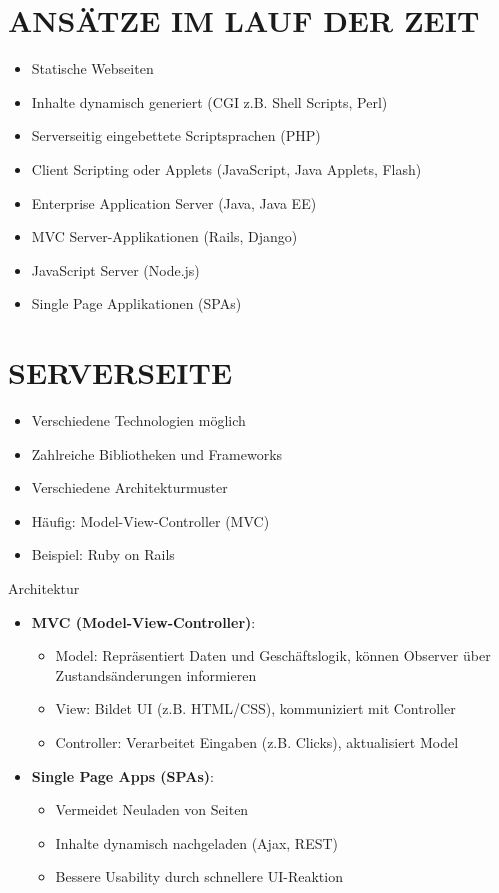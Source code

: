 \section*{ANSÄTZE IM LAUF DER ZEIT}
\begin{itemize}
  \item Statische Webseiten
  \item Inhalte dynamisch generiert (CGI z.B. Shell Scripts, Perl)
  \item Serverseitig eingebettete Scriptsprachen (PHP)
  \item Client Scripting oder Applets (JavaScript, Java Applets, Flash)
  \item Enterprise Application Server (Java, Java EE)
  \item MVC Server-Applikationen (Rails, Django)
  \item JavaScript Server (Node.js)
  \item Single Page Applikationen (SPAs)
\end{itemize}

\section*{SERVERSEITE}
\begin{itemize}
  \item Verschiedene Technologien möglich
  \item Zahlreiche Bibliotheken und Frameworks
  \item Verschiedene Architekturmuster
  \item Häufig: Model-View-Controller (MVC)
  \item Beispiel: Ruby on Rails
\end{itemize}

\begin{concept}{Architektur}
\begin{itemize}
    \item \textbf{MVC (Model-View-Controller)}:
        \begin{itemize}
            \item Model: Repräsentiert Daten und Geschäftslogik, können Observer über Zustandsänderungen informieren
            \item View: Bildet UI (z.B. HTML/CSS), kommuniziert mit Controller
            \item Controller: Verarbeitet Eingaben (z.B. Clicks), aktualisiert Model
        \end{itemize}
    \item \textbf{Single Page Apps (SPAs)}:
        \begin{itemize}
            \item Vermeidet Neuladen von Seiten
            \item Inhalte dynamisch nachgeladen (Ajax, REST)
            \item Bessere Usability durch schnellere UI-Reaktion
        \end{itemize}
\end{itemize}
\end{concept}

